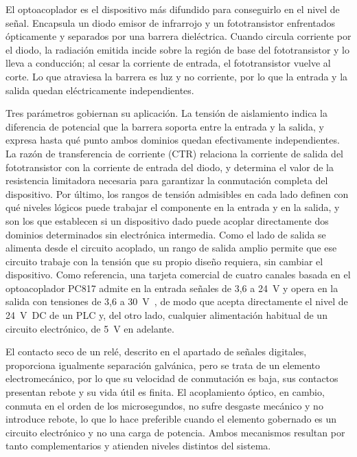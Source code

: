\documentclass[12pt,a4paper,oneside]{report}
\begin{document}
El optoacoplador es el dispositivo más difundido para conseguirlo en el nivel de señal. Encapsula un diodo emisor de infrarrojo y un fototransistor enfrentados ópticamente y separados por una barrera dieléctrica. Cuando circula corriente por el diodo, la radiación emitida incide sobre la región de base del fototransistor y lo lleva a conducción; al cesar la corriente de entrada, el fototransistor vuelve al corte. Lo que atraviesa la barrera es luz y no corriente, por lo que la entrada y la salida quedan eléctricamente independientes.

Tres parámetros gobiernan su aplicación. La tensión de aislamiento indica la diferencia de potencial que la barrera soporta entre la entrada y la salida, y expresa hasta qué punto ambos dominios quedan efectivamente independientes. La razón de transferencia de corriente (CTR) relaciona la corriente de salida del fototransistor con la corriente de entrada del diodo, y determina el valor de la resistencia limitadora necesaria para garantizar la conmutación completa del dispositivo. Por último, los rangos de tensión admisibles en cada lado definen con qué niveles lógicos puede trabajar el componente en la entrada y en la salida, y son los que establecen si un dispositivo dado puede acoplar directamente dos dominios determinados sin electrónica intermedia. Como el lado de salida se alimenta desde el circuito acoplado, un rango de salida amplio permite que ese circuito trabaje con la tensión que su propio diseño requiera, sin cambiar el dispositivo. Como referencia, una tarjeta comercial de cuatro canales basada en el optoacoplador PC817 admite en la entrada señales de 3,6 a 24~V y opera en la salida con tensiones de 3,6 a 30~V~\cite{ref13}, de modo que acepta directamente el nivel de 24~V~DC de un PLC y, del otro lado, cualquier alimentación habitual de un circuito electrónico, de 5~V en adelante.

El contacto seco de un relé, descrito en el apartado de señales digitales, proporciona igualmente separación galvánica, pero se trata de un elemento electromecánico, por lo que su velocidad de conmutación es baja, sus contactos presentan rebote y su vida útil es finita. El acoplamiento óptico, en cambio, conmuta en el orden de los microsegundos, no sufre desgaste mecánico y no introduce rebote, lo que lo hace preferible cuando el elemento gobernado es un circuito electrónico y no una carga de potencia. Ambos mecanismos resultan por tanto complementarios y atienden niveles distintos del sistema.
\end{document}
